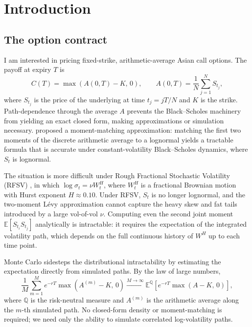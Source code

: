 \section{Introduction}

\subsection{The option contract}

I am interested in pricing fixed-strike, arithmetic-average Asian call options.  The
payoff at expiry $T$ is
\begin{equation}
  C(T) = \max\!\left(A(0,T) - K,\, 0\right), \qquad
  A(0,T) = \frac{1}{N}\sum_{j=1}^{N} S_{t_j},
\end{equation}
where $S_{t_j}$ is the price of the underlying at time $t_j = jT/N$ and $K$ is the
strike.  Path-dependence through the average $A$ prevents the Black--Scholes machinery
from yielding an exact closed form, making approximations or simulation necessary.
\citet{levy1992pricing} proposed a moment-matching approximation: matching the first
two moments of the discrete arithmetic average to a lognormal yields a tractable
formula that is accurate under constant-volatility Black--Scholes dynamics, where $S_t$
is lognormal.

The situation is more difficult under Rough Fractional Stochastic Volatility (RFSV)
\citep{gatheral2018volatility}, in which $\log\sigma_t = \nu W_t^H$, where $W_t^H$ is
a fractional Brownian motion with Hurst exponent $H \approx 0.10$.  Under RFSV, $S_t$
is no longer lognormal, and the two-moment Lévy approximation cannot capture the heavy
skew and fat tails introduced by a large vol-of-vol $\nu$.  Computing even the second
joint moment $\mathbb{E}[S_{t_i}S_{t_j}]$ analytically is intractable: it requires the
expectation of the integrated volatility path, which depends on the full continuous
history of $W^H$ up to each time point.

Monte Carlo sidesteps the distributional intractability by estimating the expectation
directly from simulated paths.  By the law of large numbers,
\begin{equation}
  \frac{1}{M}\sum_{m=1}^{M} e^{-rT}\max\!\left(A^{(m)} - K,\,0\right)
  \xrightarrow{M \to \infty}
  \mathbb{E}^{\mathbb{Q}}\!\left[e^{-rT}\max(A - K,\, 0)\right],
\end{equation}
where $\mathbb{Q}$ is the risk-neutral measure and $A^{(m)}$ is the arithmetic average
along the $m$-th simulated path.  No closed-form density or moment-matching is required;
we need only the ability to simulate correlated log-volatility paths.

